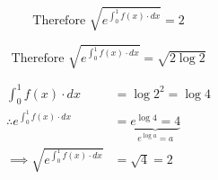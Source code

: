 \documentclass[14pt,fleqn]{extarticle}
\newcommand\intg{\int_0^1 f(x)\cdot dx}
\begin{document}
\begin{question}
\begin{step}
\end{step}

\begin{step}
  \begin{options} 
     \correct 
       
     \[ \text{Therefore } \sqrt{e^{\int_0^1 f(x)\cdot dx}} = 2 \]  
     \incorrect
     
     \[ \text{Therefore } \sqrt{e^{\int_0^1 f(x)\cdot dx}} = \sqrt{2\log 2} \]
       
        
    \end{options} 
     \reason 
     
     \begin{align}
     \intg &= \log 2^2 = \log 4 \\
	 \therefore e^{\intg} &= \underbrace{e^{\log 4} = 4}_{e^{\log a} = a}\\
	 \implies \sqrt{e^{\intg}} &= \sqrt{4} = 2 
\end{align}
       
\end{step}
      
\end{question} 
\end{document}
